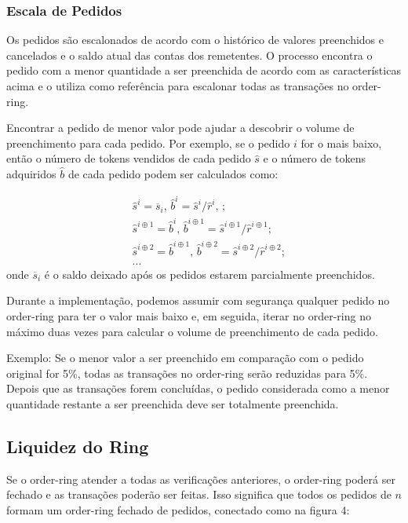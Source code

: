 \documentclass[UTF8,nofonts]{article}
\begin{document}
\begin{multicols}{2}
\subsubsection{Escala de Pedidos\label{sec:order_scaling}}
Os pedidos são escalonados de acordo com o histórico de valores preenchidos e cancelados e o saldo atual das contas dos remetentes. O processo encontra o pedido com a menor quantidade a ser preenchida de acordo com as características acima e o utiliza como referência para escalonar todas as transações no order-ring.


Encontrar a pedido de menor valor pode ajudar a descobrir o volume de preenchimento para cada pedido. Por exemplo, se o pedido $i$ for o mais baixo, então o número de tokens vendidos de cada pedido $\hat{s}$ e o número de tokens adquiridos $\hat{b}$ de cada pedido podem ser calculados como:

\[
\begin{split}
&\hat{s}^{i}=\overline{s}_i\text{, } \hat{b}^{i}=\hat{s}^{i}/ \hat{r}^i\text{, }\text{;}\\
&\hat{s}^{i\oplus 1}=\hat{b}^i\text{, } \hat{b}^{i\oplus 1}=\hat{s}^{i\oplus 1}/ \hat{r}^{i\oplus 1}\text{;}\\
&\hat{s}^{i\oplus 2}=\hat{b}^{i\oplus 1}\text{, } \hat{b}^{i\oplus 2}=\hat{s}^{i\oplus 2}/ \hat{r}^{i\oplus 2}\text{;}\\
& ...
\end{split}
\]
onde $\overline{s}_i$ é o saldo deixado após os pedidos estarem parcialmente preenchidos.

Durante a implementação, podemos assumir com segurança qualquer pedido no order-ring para ter o valor mais baixo e, em seguida, iterar no order-ring no máximo duas vezes para calcular o volume de preenchimento de cada pedido. 

Exemplo: Se o menor valor a ser preenchido em comparação com o pedido original for 5\%, todas as transações no order-ring  serão reduzidas para 5\%. Depois que as transações forem concluídas, o pedido considerada como a menor quantidade restante a ser preenchida deve ser totalmente preenchida.

\subsection{Liquidez do Ring\label{sec:settlement}}

Se o order-ring atender a todas as verificações anteriores, o order-ring poderá ser fechado e as transações poderão ser feitas. Isso significa que todos os pedidos de $n$ formam um order-ring fechado de pedidos, conectado como na figura 4:


\end{multicols}
\end{document}

